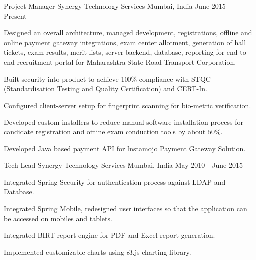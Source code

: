 

\begin{cventries}

  \cventry
    {Project Manager} %
    {Synergy Technology Services} %
    {Mumbai, India} %
    {June 2015 - Present} %
    {
      \begin{cvitems} %
        \item {Designed an overall architecture, managed development, registrations, offline and online payment gateway integrations, exam center allotment, generation of hall tickets, exam results, merit lists, server backend, database, reporting for end to end recruitment portal for Maharashtra State Road Transport Corporation.}
        \item {Built security into product to achieve 100\% compliance with STQC (Standardisation Testing and Quality Certification) and CERT-In.}
        \item {Configured client-server setup for fingerprint scanning for bio-metric verification.}
        \item {Developed custom installers to reduce manual software installation process for candidate registration and offline exam conduction tools by about 50\%.}
        \item {Developed Java based payment API for Instamojo Payment Gateway Solution.}
      \end{cvitems}
    }

  \cventry
    {Tech Lead} %
    {Synergy Technology Services} %
    {Mumbai, India} %
    {May 2010 - June 2015} %
    {
      \begin{cvitems} %
        \item {Integrated Spring Security for authentication process against LDAP and Database.}
        \item {Integrated Spring Mobile, redesigned user interfaces so that the application can be accessed on mobiles and tablets.}
        \item {Integrated BIRT report engine for PDF and Excel report generation. }
        \item {Implemented customizable charts using c3.js charting library.}
      \end{cvitems}
    }


\end{cventries}
